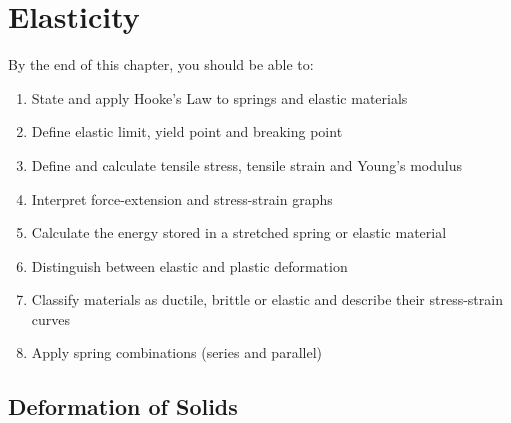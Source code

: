 %

\chapter{Elasticity}
\label{ch:elasticity}


\begin{objectivebox}
By the end of this chapter, you should be able to:
\begin{enumerate}[noitemsep]
  \item State and apply Hooke's Law to springs and
  elastic materials
  \item Define elastic limit, yield point and
  breaking point
  \item Define and calculate tensile stress, tensile
  strain and Young's modulus
  \item Interpret force-extension and stress-strain
  graphs
  \item Calculate the energy stored in a stretched
  spring or elastic material
  \item Distinguish between elastic and plastic
  deformation
  \item Classify materials as ductile, brittle or
  elastic and describe their stress-strain curves
  \item Apply spring combinations (series and parallel)
\end{enumerate}
\end{objectivebox}

\vspace{0.4cm}

\minitoc

\vspace{0.5cm}

\section{Deformation of Solids}

